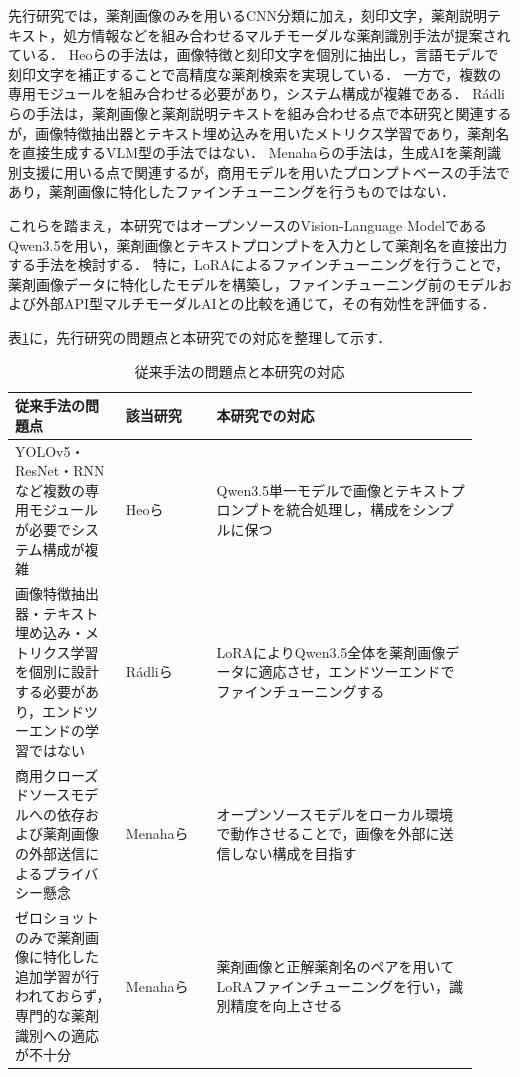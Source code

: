 \documentclass{ltjsarticle}
\begin{document}
先行研究では，薬剤画像のみを用いるCNN分類に加え，刻印文字，薬剤説明テキスト，処方情報などを組み合わせるマルチモーダルな薬剤識別手法が提案されている．
Heoらの手法は，画像特徴と刻印文字を個別に抽出し，言語モデルで刻印文字を補正することで高精度な薬剤検索を実現している．
一方で，複数の専用モジュールを組み合わせる必要があり，システム構成が複雑である．
Rádliらの手法は，薬剤画像と薬剤説明テキストを組み合わせる点で本研究と関連するが，画像特徴抽出器とテキスト埋め込みを用いたメトリクス学習であり，薬剤名を直接生成するVLM型の手法ではない．
Menahaらの手法は，生成AIを薬剤識別支援に用いる点で関連するが，商用モデルを用いたプロンプトベースの手法であり，薬剤画像に特化したファインチューニングを行うものではない．

これらを踏まえ，本研究ではオープンソースのVision-Language ModelであるQwen3.5を用い，薬剤画像とテキストプロンプトを入力として薬剤名を直接出力する手法を検討する．
特に，LoRAによるファインチューニングを行うことで，薬剤画像データに特化したモデルを構築し，ファインチューニング前のモデルおよび外部API型マルチモーダルAIとの比較を通じて，その有効性を評価する．

表\ref{tab:related}に，先行研究の問題点と本研究での対応を整理して示す．

\begin{table}[h]
\centering
\caption{従来手法の問題点と本研究の対応}
\label{tab:related}
\small
\setlength{\tabcolsep}{4pt}
\begin{tabular}{p{0.22\linewidth}p{0.18\linewidth}p{0.52\linewidth}}
\hline
従来手法の問題点 & 該当研究 & 本研究での対応 \\
\hline
YOLOv5・ResNet・RNNなど複数の専用モジュールが必要でシステム構成が複雑 &
Heoら \cite{heo2023pill} &
Qwen3.5単一モデルで画像とテキストプロンプトを統合処理し，構成をシンプルに保つ \\
\hline
画像特徴抽出器・テキスト埋め込み・メトリクス学習を個別に設計する必要があり，エンドツーエンドの学習ではない &
Rádliら \cite{radli2024metric} &
LoRAによりQwen3.5全体を薬剤画像データに適応させ，エンドツーエンドでファインチューニングする \\
\hline
商用クローズドソースモデルへの依存および薬剤画像の外部送信によるプライバシー懸念 &
Menahaら \cite{gemini2024pill} &
オープンソースモデルをローカル環境で動作させることで，画像を外部に送信しない構成を目指す \\
\hline
ゼロショットのみで薬剤画像に特化した追加学習が行われておらず，専門的な薬剤識別への適応が不十分 &
Menahaら \cite{gemini2024pill} &
薬剤画像と正解薬剤名のペアを用いてLoRAファインチューニングを行い，識別精度を向上させる \\
\hline
\end{tabular}
\end{table}
\end{document}
